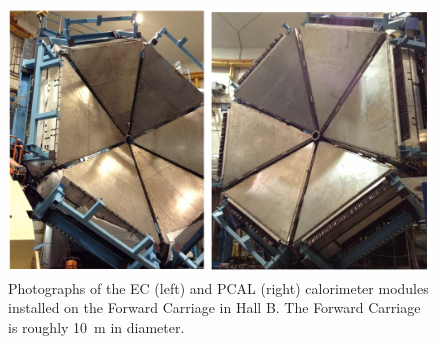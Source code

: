 \documentclass[letterpaper,10pt]{article}
\begin{document}
\begin{figure}[htbp]
  \centering
  \includegraphics[width= 5in, keepaspectratio = true]{fc-pcal-ecal}
  \vspace{2mm}
\caption{Photographs of the EC (left) and PCAL (right) calorimeter modules installed on the Forward
    Carriage in Hall B.  The Forward Carriage is roughly 10~m in diameter.}
  \label{fwd_car}
\end{figure}
\end{document}
